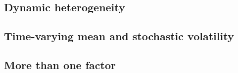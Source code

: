 \subsection*{Dynamic heterogeneity}


\subsection*{Time-varying mean and stochastic volatility}



\subsection*{More than one factor}



